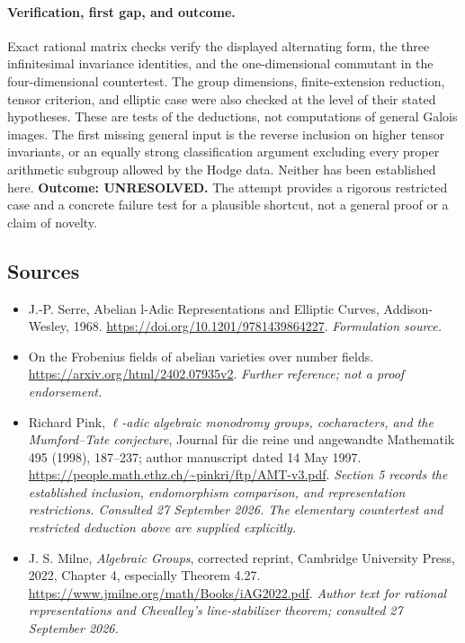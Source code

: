 \documentclass[11pt]{article}
\begin{document}
\paragraph{Verification, first gap, and outcome.}
Exact rational matrix checks verify the displayed alternating form,
the three infinitesimal invariance identities, and the one-dimensional
commutant in the four-dimensional countertest. The group dimensions,
finite-extension reduction, tensor criterion, and elliptic case were
also checked at the level of their stated hypotheses. These are tests
of the deductions, not computations of general Galois images.
The first missing general input is the reverse inclusion on higher
tensor invariants, or an equally strong classification argument
excluding every proper arithmetic subgroup allowed by the Hodge
data. Neither has been established here.
\textbf{Outcome: UNRESOLVED.} The attempt provides a rigorous restricted
case and a concrete failure test for a plausible shortcut, not a
general proof or a claim of novelty.

\subsection{Sources}
\begin{itemize}
\item[S1]J.-P. Serre, Abelian l-Adic Representations and Elliptic Curves, Addison-Wesley, 1968.
\url{https://doi.org/10.1201/9781439864227}.
\textit{Formulation source.}
\item[S2]On the Frobenius fields of abelian varieties over number fields.
\url{https://arxiv.org/html/2402.07935v2}.
\textit{Further reference; not a proof endorsement.}
\item[E1]Richard Pink, \emph{$\ell$-adic algebraic monodromy groups, cocharacters, and the Mumford--Tate conjecture}, Journal f\"ur die reine und angewandte Mathematik 495 (1998), 187--237; author manuscript dated 14 May 1997.
\url{https://people.math.ethz.ch/~pinkri/ftp/AMT-v3.pdf}.
\textit{Section 5 records the established inclusion, endomorphism comparison, and representation restrictions. Consulted 27 September 2026. The elementary countertest and restricted deduction above are supplied explicitly.}
\item[E2]J. S. Milne, \emph{Algebraic Groups}, corrected reprint, Cambridge University Press, 2022, Chapter 4, especially Theorem 4.27.
\url{https://www.jmilne.org/math/Books/iAG2022.pdf}.
\textit{Author text for rational representations and Chevalley's line-stabilizer theorem; consulted 27 September 2026.}
\end{itemize}
\end{document}
